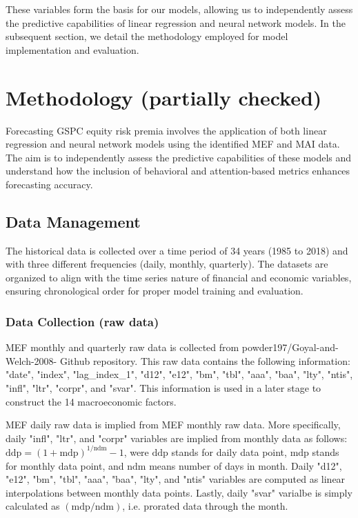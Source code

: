 \documentclass{article}
\begin{document}
These variables form the basis for our models, allowing us to independently assess the predictive capabilities of linear regression and neural network models. In the subsequent section, we detail the methodology employed for model implementation and evaluation.

\newpage

\section{Methodology (partially checked)}

Forecasting GSPC equity risk premia involves the application of both linear regression and neural network models using the identified MEF and MAI data. The aim is to independently assess the predictive capabilities of these models and understand how the inclusion of behavioral and attention-based metrics enhances forecasting accuracy.

\subsection{Data Management}

The historical data is collected over a time period of 34 years (1985 to 2018) and with three different frequencies (daily, monthly, quarterly). The datasets are organized to align with the time series nature of financial and economic variables, ensuring chronological order for proper model training and evaluation.

\subsubsection{Data Collection (raw data)}
  
MEF monthly and quarterly raw data is collected from powder197/Goyal-and-Welch-2008- Github repository. This raw data contains the following information: "date", "index", "lag\_index\_1", "d12", "e12", "bm", "tbl", "aaa", "baa", "lty", "ntis", "infl", "ltr", "corpr", and "svar". This information is used in a later stage to construct the 14 macroeconomic factors.

MEF daily raw data is implied from MEF monthly raw data. More specifically, daily "infl", "ltr", and "corpr" variables are implied from monthly data as follows: $\text{ddp} = (1+\text{mdp})^{1/\text{ndm}}-1$, were $\text{ddp}$ stands for daily data point, $\text{mdp}$ stands for monthly data point, and $\text{ndm}$ means number of days in month. 
Daily "d12", "e12", "bm", "tbl", "aaa", "baa", "lty", and "ntis" variables are computed as linear interpolations between monthly data points. Lastly, daily "svar" varialbe is simply calculated as $(\text{mdp}/\text{ndm})$, i.e. prorated data through the month.
\end{document}
